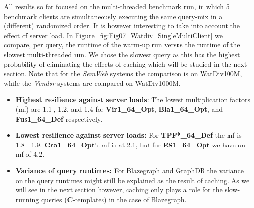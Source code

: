All results so far focused on the multi-threaded benchmark run, in which 5 benchmark clients are simultaneously executing the same query-mix in a (different) randomized order. It is however interesting to take into account the effect of server load. In Figure~\ref{fig:Fig07_Watdiv_SingleMultiClient} we compare, per query, the runtime of the warm-up run versus the runtime of the slowest multi-threaded run. We chose the slowest query as this has the highest probability of eliminating the effects of caching which will be studied in the next section. Note that for the \emph{SemWeb} systems the comparison is on WatDiv100M, while the \emph{Vendor} systems are compared on WatDiv1000M.


\begin{itemize}
	\item \textbf{Highest resilience against server loads}: The lowest multiplication factors (mf) are 1.1 , 1.2, and 1.4 for \textbf{Vir1\_64\_Opt}, \textbf{Bla1\_64\_Opt}, and \textbf{Fus1\_64\_Def} respectively. 
	 
	\item \textbf{Lowest resilience against server loads:} For \textbf{TPF*\_64\_Def} the mf is 1.8 - 1.9.  \textbf{Gra1\_64\_Opt}'s mf is at 2.1, but for \textbf{ES1\_64\_Opt} we have an mf of 4.2.
	
	\item \textbf{Variance of query runtimes:} For Blazegraph and GraphDB the variance on the query runtimes might still be explained as the result of caching. As we will see in the next section however, caching only plays a role for the slow-running queries (\textbf{C}-templates) in the case of Blazegraph.
\end{itemize}
